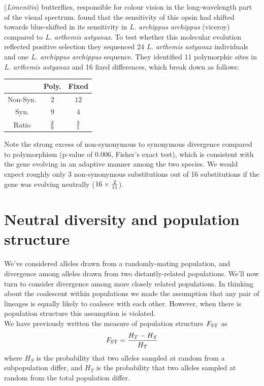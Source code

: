 ({\it Limenitis}) butterflies, responsible for colour vision in the long-wavelength part of the visual spectrum. \citeauthor{frentiu2007adaptive} found that the sensitivity of this opsin had shifted towards blue-shifted in its sensitivity in {\it L. archippus archippus} (viceroy) compared to {\it  L. arthemis astyanax}. To test whether this molecular evolution reflected positive selection they sequenced  24 {\it L. arthemis astyanax} individuals and one {\it  L. archippus archippus} sequence. They identified  11 polymorphic sites in  {\it L. arthemis astyanax} and 16 fixed differences, which break down as follows:
\begin{center}
\begin{tabular}{ccc}
 & Poly. & Fixed  \\
 \hline
Non-Syn. &    $2$  &   $12$ \\
Syn. &    $9$   &     $4$  \\
Ratio & $\nicefrac{2}{9}$  & $\nicefrac{3}{1}$
\end{tabular}
\end{center}
Note the strong excess of non-synonymous to synonymous divergence compared to polymorphism (p-value of $0.006$, Fisher's exact test), which is consistent with the gene evolving in an adaptive manner among the two species. We would expect roughly only $3$ non-synonymous substitutions out of 16 substitutions if the gene was evolving neutrally ($ 16 \times \nicefrac{2}{11}$). 


\section{Neutral diversity and population structure}
We've considered alleles drawn from a randomly-mating population, and divergence among alleles drawn from two distantly-related populations. 
We'll now turn to consider divergence among more closely related populations. In thinking about the coalescent  within populations we made the assumption that any pair of lineages is equally likely to coalesce with each
other. However, when there is population structure this assumption is violated. \\

We have previously written the measure of population structure
$\fst$ as
\begin{equation}
\fst = \frac{H_T-H_S}{H_T}
\end{equation}
where $H_S$ is the probability that two alleles sampled at random from a
subpopulation differ, and $H_T$ is the probability that two alleles
sampled at random from the total population differ. 

